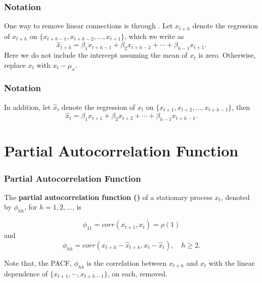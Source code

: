 \documentclass[%
xcolor=pdftex]{beamer}
\begin{document}
\begin{frame}
\frametitle{Notation}

One way to remove linear connections is through \underline{\hspace{15 mm}} \underline{\hspace{20 mm}}. Let $\hat{x}_{t+h}$ denote the regression of $x_{t+h}$ on
$\{x_{t+h-1},x_{t+h-2},\ldots,x_{t+1}\}$, which we write as
\begin{equation}
\hat{x}_{t+h} = \beta_1 x_{t+h-1} + \beta_2 x_{t+h-2} + \cdots + \beta_{h-1} x_{t+1}.
\end{equation}
Here we do not include the intercept assuming the mean of $x_t$
is zero. Otherwise, replace $x_t$ with $x_t - \mu_x$.

\end{frame}

\begin{frame}
\frametitle{Notation}

In addition, let $\hat{x}_t$ denote the regression of
$x_t$ on $\{x_{t+1},x_{t+2},\ldots,x_{t+h-1}\}$, then
\begin{equation}
\hat{x}_t = \beta_1 x_{t+1} + \beta_2 x_{t+2} + \cdots + \beta_{h-1} x_{t+h-1}.
\end{equation}

\end{frame}

\section{Partial Autocorrelation Function}
\frame{\tableofcontents[currentsection]}

\begin{frame}
\frametitle{Partial Autocorrelation Function}

The {\bf partial autocorrelation
function (\underline{\hspace{10 mm}})} of a stationary process $x_t$, denoted by
$\phi_{hh}$, for $h=1,2,\ldots$, is

\begin{equation}
\phi_{11} = corr(x_{t+1},x_t) = \rho(1)
\end{equation}
and
\begin{equation}
\phi_{hh}=corr(x_{t+h}-\hat{x}_{t+h}, x_t-\hat{x}_t), \quad h\ge 2.
\end{equation}

Note that, the PACF, $\phi_{hh}$ is the correlation between
$x_{t+h}$ and $x_{t}$ with the linear dependence of
$\{x_{t+1},\cdots,x_{t+h-1}\}$, on each, removed.

\end{frame}
\end{document}

